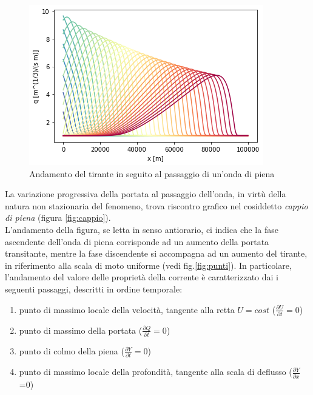 \documentclass[12pt]{article} %
\begin{document}
\begin{figure} [H]
    \centering
    \includegraphics{Onda.png}
    \caption{Andamento del tirante in seguito al passaggio di un'onda di piena}
    \label{fig:onda}
\end{figure}

\noindent La variazione progressiva della portata al passaggio dell'onda, in virtù della natura non stazionaria del fenomeno, trova riscontro grafico nel cosiddetto \textit{cappio di piena} (figura \ref{fig:cappio}). \\ L'andamento della figura, se letta in senso antiorario, ci indica che la fase ascendente dell'onda di piena corrisponde ad un aumento della portata transitante, mentre la fase discendente si accompagna ad un aumento del tirante, in riferimento alla scala di moto uniforme (vedi fig.\ref{fig:punti}). In particolare, l'andamento del valore delle proprietà della corrente è caratterizzato dai i seguenti passaggi, descritti in ordine temporale:
\begin{enumerate}
    \item punto di massimo locale della velocità, tangente alla retta $U=cost$ ($\frac{\partial U}{\partial t}=0$)
    \item punto di massimo della portata ($\frac{\partial Q}{\partial t}=0$)
    \item punto di colmo della piena ($\frac{\partial Y}{\partial t}=0$)
    \item punto di massimo locale della profondità, tangente alla scala di deflusso ($\frac{\partial Y}{\partial x}$=0)
\end{enumerate}
\end{document}
